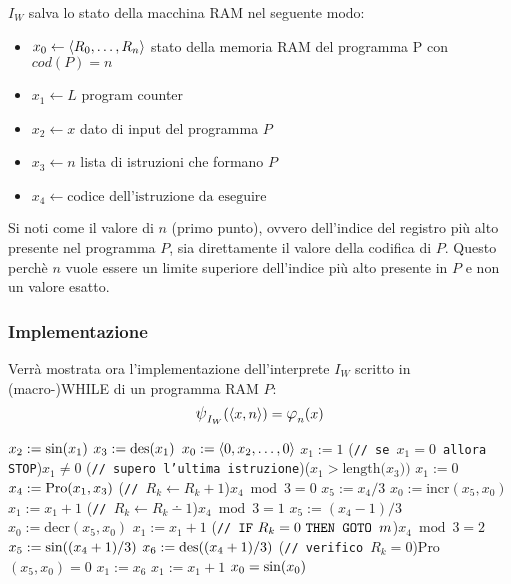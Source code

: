 $I_W$ salva lo stato della macchina RAM nel seguente modo:
\begin{itemize}
    \item $x_0 \leftarrow \langle R_0,\dots,R_{n}\rangle$\hfill
        stato della memoria RAM del programma P con $cod(P)=n$
    \item $x_1 \leftarrow L$ \hfill program counter
    \item $x_2 \leftarrow x$ \hfill dato di input del programma $P$
    \item $x_3 \leftarrow n$ \hfill lista di istruzioni che formano $P$
    \item $x_4 \leftarrow \text{codice dell'istruzione da eseguire}$
\end{itemize}

Si noti come il valore di $n$ (primo punto), ovvero dell'indice del registro più alto 
presente nel programma $P$, sia direttamente il valore della codifica di $P$. Questo
perchè $n$ vuole essere un limite superiore dell'indice più alto presente in $P$ e non
un valore esatto.

\subsubsection*{Implementazione}
Verrà mostrata ora l'implementazione dell'interprete $I_W$ scritto in (macro-)WHILE di un
programma RAM $P$:
$$ \semanticaWHILE_{I_W}(\cantor{x,n})=\semanticaRAM_n(x) $$
\begin{tcolorbox}[colback=white,sharp corners,boxrule=.3mm]
\begin{algorithm}[H]
    \SetAlgoNoEnd
    $x_2 := \text{sin}(x_1)$\;
    $x_3 := \text{des}(x_1)$\;
    $x_0 := \langle0,x_2,\dots,0\rangle$\;
    $x_1 := 1$\;
    \While(\hfill\texttt{// se $x_1=0$ allora STOP}){$x_1\neq 0$}{
        \eIf(\hfill\texttt{// supero l'ultima istruzione}){($x_1>\text{length($x_3$))}$}{
            $x_1:=0$
        }{
            $x_4 := \text{Pro}(x_1,x_3)$
            \If(\hfill\texttt{// }$R_k\leftarrow R_k+1$){$x_4\bmod{3}=0$}{
                $x_5 := x_4 / 3$
                $x_0 := \text{incr}(x_5,x_0)$\;
                $x_1 := x_1+1$\;
            }
            \If(\hfill\texttt{// }$R_k\leftarrow R_k\dotminus1$){$x_4\bmod{3}=1$}{
                $x_5 := (x_4-1) / 3$
                $x_0 := \text{decr}(x_5,x_0)$\;
                $x_1 := x_1+1$\;
            }
            \If(\hfill\texttt{// }$\texttt{IF}\text{ $R_k=0$ }\texttt{THEN GOTO }\text{$m$}$){$x_4\bmod{3}=2$}{
                $x_5 := \text{sin}((x_4+1)/3)$
                $x_6 := \text{des}((x_4+1)/3)$
                \eIf(\hfill\texttt{// verifico }$R_k=0$){Pro$(x_5,x_0)=0$}{
                    $x_1:=x_6$\;
                }{
                    $x_1:=x_1+1$\;
                }
            }
        }
    }
    $x_0 = \text{sin}(x_0)$
\end{algorithm}
\end{tcolorbox}

